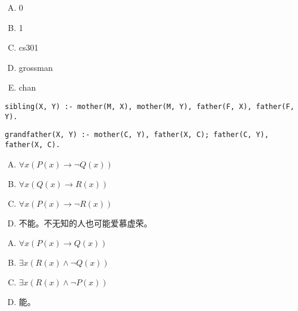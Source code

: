 {{        %
        \begin{practices}
            \begin{enumerate}[A.]
                \item 0
                \item 1
                \item cs301
                \item grossman
                \item chan
            \end{enumerate}
        \end{practices}

        \begin{practices}
                \begin{lstlisting}
sibling(X, Y) :- mother(M, X), mother(M, Y), father(F, X), father(F, Y).
                \end{lstlisting}
        \end{practices}

        \begin{practices}
                \begin{lstlisting}
grandfather(X, Y) :- mother(C, Y), father(X, C); father(C, Y), father(X, C).
                \end{lstlisting}
        \end{practices}

        \begin{practices}
            \begin{enumerate}[A.]
                \item $\forall x (P(x) \rightarrow \neg Q(x))$
                \item $\forall x (Q(x) \rightarrow R(x))$
                \item $\forall x (P(x) \rightarrow \neg R(x))$
                \item 不能。不无知的人也可能爱慕虚荣。
            \end{enumerate}
        \end{practices}

        \begin{practices}
            \begin{enumerate}[A.]
                \item $\forall x (P(x) \rightarrow Q(x))$
                \item $\exists x (R(x) \wedge \neg Q(x))$
                \item $\exists x (R(x) \wedge \neg P(x))$
                \item 能。
            \end{enumerate}
        \end{practices}

}}
